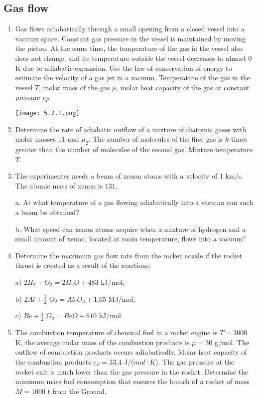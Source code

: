 \documentclass{article}
\begin{document}
\subsection{Gas flow}

\begin{enumerate}[label=5.7.\arabic*]

\item Gas flows adiabatically through a small opening from a closed vessel into a vacuum space. Constant gas pressure in the vessel is maintained by moving the piston. At the same time, the temperature of the gas in the vessel also does not change, and its temperature outside the vessel decreases to almost $0$ K due to adiabatic expansion. Use the law of conservation of energy to estimate the velocity of a gas jet in a vacuum. Temperature of the gas in the vessel $T$, molar mass of the gas $\mu$, molar heat capacity of the gas at constant pressure $c_P$

\begin{center}
    \texttt{[image: 5.7.1.png]}
\end{center}

\item Determine the rate of adiabatic outflow of a mixture of diatomic gases with molar masses µ1 and $\mu_2$. The number of molecules of the first gas is $k$ times greater than the number of molecules of the second gas. Mixture temperature $T$.

\item The experimenter needs a beam of xenon atoms with a velocity of $1$ km/s. The atomic mass of xenon is $131$.

a. At what temperature of a gas flowing adiabatically into a vacuum can such a beam be obtained? 

b. What speed can xenon atoms acquire when a mixture of hydrogen and a small amount of xenon, located at room temperature, flows into a vacuum?

\item Determine the maximum gas flow rate from the rocket nozzle if the rocket thrust is created as a result of the reactions:

a) $2H_2 + O_2 = 2H_2O + 483$ kJ/mol; 

b) $2Al + \frac{3}{2}$ $O_2 = Al_2O_3 + 1.65$ MJ/mol; 

c) $Be + \frac{1}{2}$ $O_2 = BeO + 610$ kJ/mol.

\item The combustion temperature of chemical fuel in a rocket engine is $T = 3000$ K, the average molar mass of the combustion products is $\mu = 30$ g/mol. The outflow of combustion products occurs adiabatically. Molar heat capacity of the combustion products $c_P = 33.4$ J/($mol \cdot K$). The gas pressure at the rocket exit is much lower than the gas pressure in the rocket. Determine the minimum mass fuel consumption that ensures the launch of a rocket of mass $M = 1000$ t from the Ground.


\end{enumerate}
\end{document}
